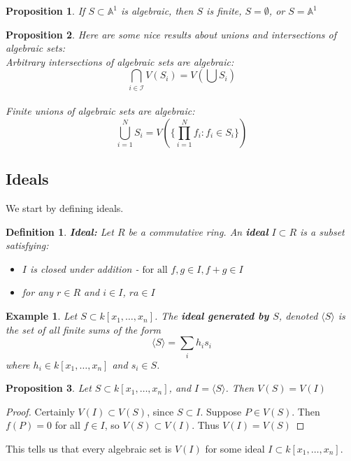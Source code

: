 \documentclass{article}
\newtheorem{definition}{Definition}[section]
\newtheorem{exmp}{Example}[section]
\newtheorem{prop}{Proposition}[section]
\begin{document}
\begin{prop}
    If $S \subset \mathbb{A}^1$ is algebraic, then $S$ is finite, $S = \emptyset$, or $S = \mathbb{A}^1$
\end{prop}

\begin{prop}
    Here are some nice results about unions and intersections of algebraic sets: \\
    Arbitrary intersections of algebraic sets are algebraic: \[ \bigcap_{i \in \mathcal{I}} V(S_i)  = V(\bigcup S_i)\] \\
    Finite unions of algebraic sets are algebraic: \[ \bigcup_{i=1}^N S_i = V(\{ \prod_{i=1}^N f_i : f_i \in S_i  \})\]
\end{prop}

\subsection{Ideals}

We start by defining ideals.
\begin{definition}
    \textbf{Ideal:} Let $R$ be a commutative ring. An \textbf{ideal} $I \subset R$ is a subset satisfying:
    \begin{itemize}
        \item $I$ is closed under addition - \(\text{for all } f, g \in I, f+g \in I\)
        \item for any $r \in R$ and $i \in I$, $ra \in I$
    \end{itemize}
\end{definition}

\begin{exmp}
Let \( S \subset k[x_1, \ldots, x_n]\). The \textbf{ideal generated by $S$}, denoted $\langle S \rangle$ is the set of all finite sums of the form
\[ \langle S \rangle = \sum_i h_i s_i \] where \( h_i \in k[x_1, \ldots, x_n]  \) and \( s_i \in S\).
\end{exmp}

\begin{prop}
    Let $S  \subset k[x_1, \ldots, x_n]$, and $I = \langle S \rangle$. Then $V(S) = V(I)$
\end{prop}
\begin{proof}
Certainly $V(I) \subset V(S)$, since $S \subset I$. Suppose $P \in V(S)$. Then $f(P) = 0$ for all $f \in I$, so $V(S) \subset V(I)$. Thus $V(I) = V(S)$
\end{proof}
This tells us that every algebraic set is $V(I)$ for some ideal $I \subset k[x_1, \ldots, x_n]$. \\
\end{document}
